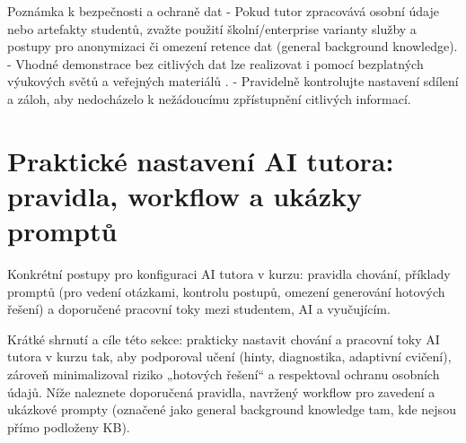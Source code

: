 \documentclass{report}%
\begin{document}
Poznámka k bezpečnosti a ochraně dat
- Pokud tutor zpracovává osobní údaje nebo artefakty studentů, zvažte použití školní/enterprise varianty služby a postupy pro anonymizaci či omezení retence dat (general background knowledge).
- Vhodné demonstrace bez citlivých dat lze realizovat i pomocí bezplatných výukových světů a veřejných materiálů \cite{kb_ai_101_tipu_pdf_04e4a115_page_15_2}.
- Pravidelně kontrolujte nastavení sdílení a záloh, aby nedocházelo k nežádoucímu zpřístupnění citlivých informací.%

%
\section{Praktické nastavení AI tutora: pravidla, workflow a ukázky promptů}%
Konkrétní postupy pro konfiguraci AI tutora v kurzu: pravidla chování, příklady promptů (pro vedení otázkami, kontrolu postupů, omezení generování hotových řešení) a doporučené pracovní toky mezi studentem, AI a vyučujícím.%


%
\begin{flushleft}
Krátké shrnutí a cíle této sekce: prakticky nastavit chování a pracovní toky AI tutora v kurzu tak, aby podporoval učení (hinty, diagnostika, adaptivní cvičení), zároveň minimalizoval riziko „hotových řešení“ a respektoval ochranu osobních údajů. Níže naleznete doporučená pravidla, navržený workflow pro zavedení a ukázkové prompty (označené jako general background knowledge tam, kde nejsou přímo podloženy KB).
\end{flushleft}
\end{document}
